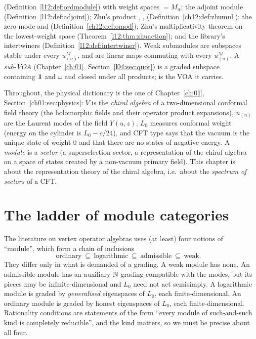(Definition~\ref{l12:def:ordmodule}) with weight spaces  $=M_\alpha$; the adjoint
module (Definition~\ref{l12:def:adjoint}); Zhu's product , , 
(Definition~\ref{ch12:def:zhumul}); the zero mode  and 
(Definition~\ref{ch12:def:omod}); Zhu's multiplicativity theorem on the lowest-weight space
(Theorem~\ref{l12:thm:zhuaction}); and the library's intertwiners
(Definition~\ref{l12:def:intertwiner}). Weak submodules  are subspaces
stable under every $u^M_{(n)}$, and  are linear maps commuting with every
$u^M_{(n)}$. A \emph{sub-VOA}  (Chapter~\ref{ch:01},
Section~\ref{l04:sec:quot}) is a graded subspace containing $\mathbf{1}$ and $\omega$ and closed
under all products;  is the VOA it carries.

\begin{physics}
Throughout, the physical dictionary is the one of Chapter~\ref{ch:01}, Section~\ref{ch01:sec:physics}: $V$ is the
\emph{chiral algebra} of a two-dimensional conformal field theory (the holomorphic fields and their operator
product expansions), $u_{(n)}$ are the Laurent modes of the field $Y(u,z)$, $L_0$ measures conformal weight
(energy on the cylinder is $L_0-c/24$), and CFT type says that the vacuum is the unique state of weight $0$ and
that there are no states of negative energy. A \emph{module} is a \emph{sector} (a superselection sector, a
representation of the chiral algebra on a space of states created by a non-vacuum primary field). This chapter
is about the representation theory of the chiral algebra, i.e.\ about the \emph{spectrum of sectors} of a CFT.
\end{physics}

\section{The ladder of module categories}\label{l12:sec:categories}

The literature on vertex operator algebras uses (at least) four notions of ``module'', which form
a chain of inclusions
\begin{equation*}
 \text{ordinary}\ \subseteq\ \text{logarithmic}\ \subseteq\ \text{admissible}\ \subseteq\ \text{weak}.
\end{equation*}
They differ only in what is demanded of a grading. A weak module has none. An admissible module has
an auxiliary ${\mathbb{N}}$-grading compatible with the modes, but its pieces may be infinite-dimensional and
$L_0$ need not act semisimply. A logarithmic module is graded by \emph{generalised} eigenspaces of
$L_0$, each finite-dimensional. An ordinary module is graded by honest eigenspaces of $L_0$, each
finite-dimensional. Rationality conditions are statements of the form ``every module of such-and-such
kind is completely reducible'', and the kind matters, so we must be precise about all four.

